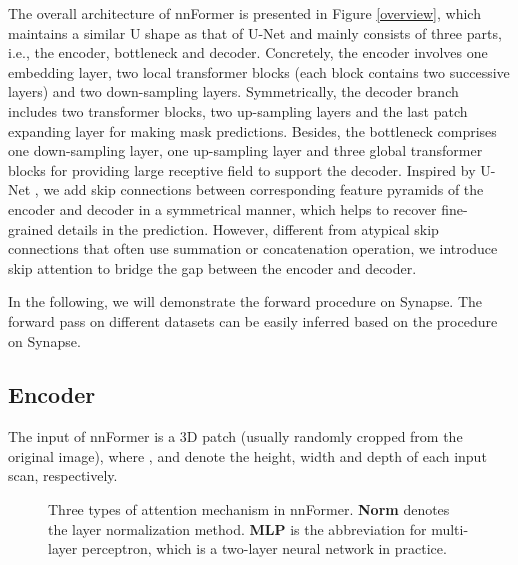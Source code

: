 \documentclass[journal,twoside,web]{ieeecolor}
\begin{document}
The overall architecture of nnFormer is presented in Figure \ref{overview}, which maintains a similar U shape as that of U-Net \cite{ronneberger2015u} and mainly consists of three parts, i.e., the encoder, bottleneck and decoder. Concretely, the encoder involves one embedding layer, two local transformer blocks (each block contains two successive layers) and two down-sampling layers. Symmetrically, the decoder branch includes two transformer blocks, two up-sampling layers and the last patch expanding layer for making mask predictions. Besides, the bottleneck comprises one down-sampling layer, one up-sampling layer and three global transformer blocks for providing large receptive field to support the decoder. Inspired by U-Net \cite{ronneberger2015u}, we add skip connections between corresponding feature pyramids of the encoder and decoder in a symmetrical manner, which helps to recover fine-grained details in the prediction. However, different from atypical skip connections that often use summation or concatenation operation, we introduce skip attention to bridge the gap between the encoder and decoder. 

In the following, we will demonstrate the forward procedure on Synapse. The forward pass on different datasets can be easily inferred based on the procedure on Synapse.



\subsection{Encoder}
The input of nnFormer is a 3D patch  (usually randomly cropped from the original image), where ,  and  denote the height, width and depth of each input scan, respectively.\\

\begin{figure*}[t]
    \centering
    \caption{Three types of attention mechanism in nnFormer. \textbf{Norm} denotes the layer normalization method. \textbf{MLP} is the abbreviation for multi-layer perceptron, which is a two-layer neural network in practice.}
    \label{att_mech}
\end{figure*}
\end{document}
